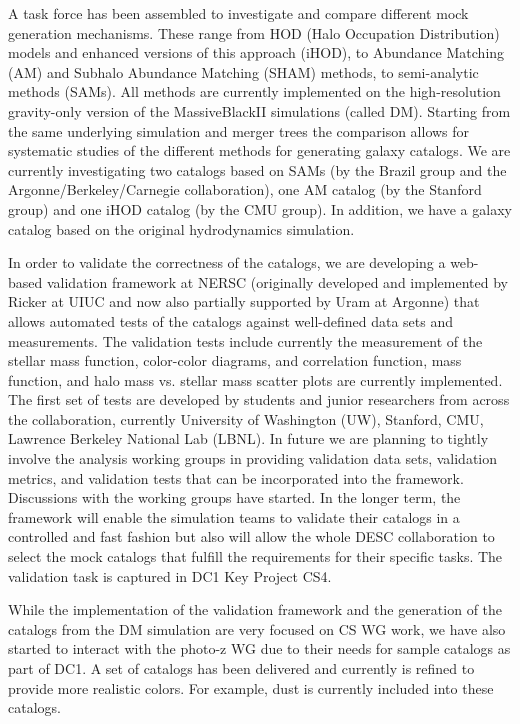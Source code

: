 A task force has been assembled to investigate and compare different mock generation mechanisms. These range from HOD (Halo Occupation Distribution) models and enhanced versions of this approach (iHOD), to Abundance Matching (AM) and Subhalo Abundance Matching  (SHAM) methods, to semi-analytic methods (SAMs). All methods are currently implemented on the high-resolution gravity-only version of the MassiveBlackII simulations (called DM). Starting from the same underlying simulation and merger trees the comparison allows for systematic studies of the different methods for generating galaxy catalogs. We are currently investigating two catalogs based on SAMs (by the Brazil group and the Argonne/Berkeley/Carnegie collaboration), one AM catalog (by the Stanford group) and one iHOD catalog (by the CMU group). In addition, we have a galaxy catalog based on the original hydrodynamics simulation.

In order to validate the correctness of the catalogs, we are developing a web-based validation framework at NERSC (originally developed and implemented by Ricker at UIUC and now also partially supported by Uram at Argonne) that allows automated tests of the catalogs against well-defined data sets and measurements. The validation tests include currently the measurement of the stellar mass function, color-color diagrams, and correlation function, mass function, and halo mass vs. stellar mass scatter plots are currently implemented. The first set of tests are developed by students and junior researchers from across the collaboration, currently University of Washington (UW), Stanford, CMU, Lawrence Berkeley National Lab (LBNL). In future we are planning to tightly involve the analysis working groups in providing validation data sets, validation metrics, and validation tests that can be incorporated into the framework. Discussions with the working groups have started. In the longer term, the framework will enable the simulation teams to validate their catalogs in a controlled and fast fashion but also will allow the whole DESC collaboration to select the mock catalogs that fulfill the requirements for their specific tasks. The validation task is captured in DC1 Key Project CS4.

While the implementation of the validation framework and the generation of the catalogs from the DM simulation are very focused on CS WG work, we have also started to interact with the photo-z WG due to their needs for sample catalogs as part of DC1. A set of catalogs has been delivered and currently is refined to provide more realistic colors. For example, dust is currently included into these catalogs. 

